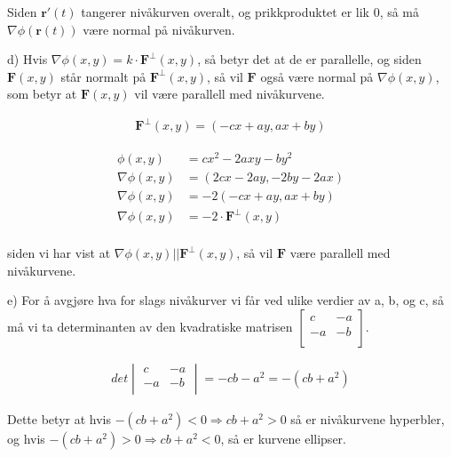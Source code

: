 \documentclass[12pt, a4paper]{article}
\begin{document}
Siden $\textbf{r}'(t)$ tangerer nivåkurven overalt, og prikkproduktet er lik $0$, så må $\nabla\phi(\textbf{r}(t))$ være normal på nivåkurven.

d) Hvis $\nabla\phi(x,y) = k \cdot \textbf{F}^\perp(x,y)$, så betyr det at de er parallelle, og siden $\textbf{F}(x,y)$ står normalt på $\textbf{F}^\perp(x,y)$,
så vil $\textbf{F}$ også være normal på $\nabla\phi(x,y)$, som betyr at $\textbf{F}(x,y)$ vil være parallell med nivåkurvene.

\begin{equation}
    \begin{split}
        \textbf{F}^\perp(x,y) = (-cx + ay, ax + by)
    \end{split}
\end{equation}

\begin{equation}
    \begin{split}
        \phi(x,y) &= cx^2 - 2axy - by^2 \\
        \nabla\phi(x,y) &= (2cx - 2ay, -2by - 2ax) \\
        \nabla\phi(x,y) &= -2(-cx + ay, ax + by) \\
        \nabla\phi(x,y) &= -2 \cdot \textbf{F}^\perp(x,y) \\
    \end{split}
\end{equation}

siden vi har vist at $\nabla\phi(x,y) || \textbf{F}^\perp(x,y)$, så vil $\textbf{F}$ være parallell med nivåkurvene. 

e) For å avgjøre hva for slags nivåkurver vi får ved ulike verdier av a, b, og c, så må vi ta determinanten av den kvadratiske matrisen 
$
\begin{bmatrix}
    c  & -a \\
    -a & -b \\
\end{bmatrix}
$.

\begin{equation}
    \begin{split}
        det \begin{vmatrix}
            c  & -a \\
            -a & -b \\
        \end{vmatrix} = -cb - a^2 = -(cb + a^2)
    \end{split}
\end{equation}

Dette betyr at hvis $-(cb + a^2) < 0 \Rightarrow cb + a^2 > 0$ så er nivåkurvene hyperbler, og hvis $-(cb + a^2) > 0 \Rightarrow cb + a^2 < 0$, så er kurvene ellipser.
\end{document}
